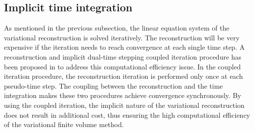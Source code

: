 \subsection{Implicit time integration}
\label{ssec:TimeMarching}

As mentioned in the previous subsection, the linear equation system of the variational reconstruction is solved iteratively. The reconstruction will be very expensive if the iteration needs to reach convergence at each single time step. A reconstruction and implicit dual-time stepping coupled iteration procedure has been proposed in \cite{wang2016compact1_VR} to address this computational efficiency issue. In the coupled iteration procedure, the reconstruction iteration is performed only once at each pseudo-time step. The coupling between the reconstruction and the time integration makes these two procedures achieve convergence synchronously. By using the coupled iteration, the implicit nature of the variational reconstruction does not result in additional cost, thus ensuring the high computational efficiency of the variational finite volume method.

